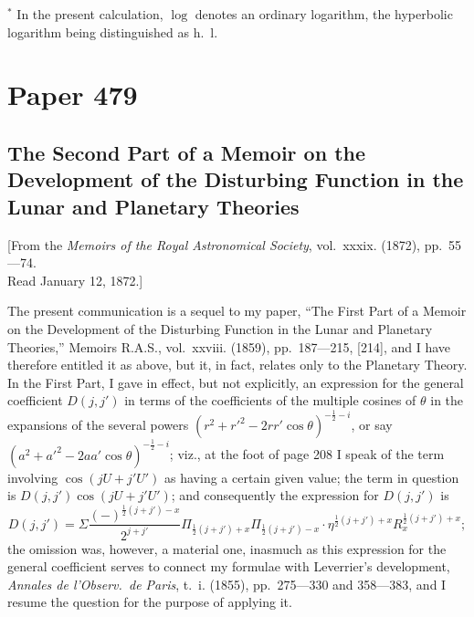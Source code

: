 \documentclass[11pt,a4paper]{article}
\begin{document}
$^{*}$ In the present calculation, $\log$ denotes an ordinary logarithm, the hyperbolic logarithm being distinguished as h.~l.

\newpage

\section*{Paper 479}

\subsection*{The Second Part of a Memoir on the Development of the Disturbing Function in the Lunar and Planetary Theories}

\begin{center}
[From the \textit{Memoirs of the Royal Astronomical Society}, vol.~xxxix. (1872), pp.~55---74.\\
Read January 12, 1872.]
\end{center}

The present communication is a sequel to my paper, ``The First Part of a Memoir on the Development of the Disturbing Function in the Lunar and Planetary Theories,'' Memoirs R.A.S., vol.~xxviii. (1859), pp.~187---215, [214], and I have therefore entitled it as above, but it, in fact, relates only to the Planetary Theory. In the First Part, I gave in effect, but not explicitly, an expression for the general coefficient $D(j, j')$ in terms of the coefficients of the multiple cosines of $\theta$ in the expansions of the several powers $(r^{2} + r'^{2} - 2rr'\cos\theta)^{-\frac{1}{2}-i}$, or say $(a^{2} + a'^{2} - 2aa'\cos\theta)^{-\frac{1}{2}-i}$; viz., at the foot of page 208 I speak of the term involving $\cos(jU + j'U')$ as having a certain given value; the term in question is $D(j, j') \cos(jU + j'U')$; and consequently the expression for $D(j, j')$ is
\[
D(j, j') = \Sigma \frac{(-)^{\frac{1}{2}(j+j')-x}}{2^{j+j'}} \Pi_{\frac{1}{2}(j+j')+x} \Pi_{\frac{1}{2}(j+j')-x} \cdot \eta^{\frac{1}{2}(j+j')+x} R_{x}^{\frac{1}{2}(j+j')+x};
\]
the omission was, however, a material one, inasmuch as this expression for the general coefficient serves to connect my formulae with Leverrier's development, \textit{Annales de l'Observ.\ de Paris}, t.~i. (1855), pp.~275---330 and 358---383, and I resume the question for the purpose of applying it.
\end{document}
